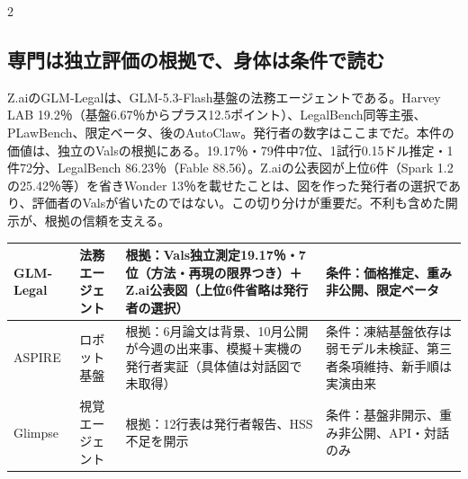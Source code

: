 \documentclass[lualatex,a4paper,10pt]{jlreq}
\begin{document}
\begin{multicols}{2}
\subsection*{専門は独立評価の根拠で、身体は条件で読む}

Z.aiのGLM-Legalは、GLM-5.3-Flash基盤の法務エージェントである。Harvey LAB 19.2％（基盤6.67％からプラス12.5ポイント）、LegalBench同等主張、PLawBench、限定ベータ、後のAutoClaw。発行者の数字はここまでだ。本件の価値は、独立のValsの根拠にある。19.17％・79件中7位、1試行0.15ドル推定・1件72分、LegalBench 86.23％（Fable 88.56）。Z.aiの公表図が上位6件（Spark 1.2の25.42％等）を省きWonder 13％を載せたことは、図を作った発行者の選択であり、評価者のValsが省いたのではない。この切り分けが重要だ。不利も含めた開示が、根拠の信頼を支える。
\cite{B55,B53,B54}

\end{multicols} %

{\centering\footnotesize
{}
\begin{tabularx}{0.96\linewidth}{@{}lXXX@{}}
\toprule
GLM-Legal & 法務エージェント & 根拠：Vals独立測定19.17％・7位（方法・再現の限界つき）＋Z.ai公表図（上位6件省略は発行者の選択） & 条件：価格推定、重み非公開、限定ベータ \cite{B55,B53,B54} \\
\midrule
ASPIRE & ロボット基盤 & 根拠：6月論文は背景、10月公開が今週の出来事、模擬＋実機の発行者実証（具体値は対話図で未取得） & 条件：凍結基盤依存は弱モデル未検証、第三者条項維持、新手順は実演由来 \cite{B57,B56,B89} \\
\midrule
Glimpse & 視覚エージェント & 根拠：12行表は発行者報告、HSS不足を開示 & 条件：基盤非開示、重み非公開、API・対話のみ \cite{B58,B59,B88} \\
\bottomrule
\end{tabularx}
} %
\end{document}

